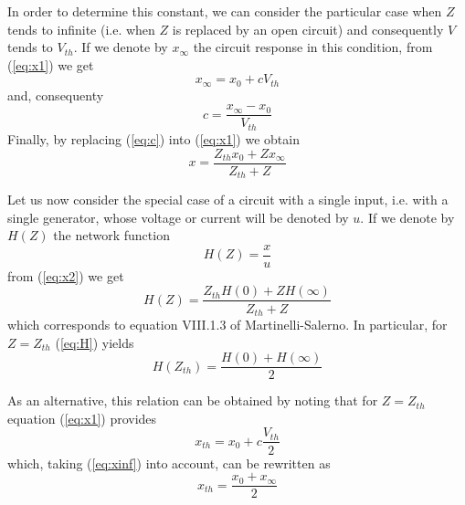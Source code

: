 \documentclass[journal]{IEEEtran}
\begin{document}
In order to determine this constant, we can consider the particular case when $Z$ tends to infinite (i.e. when $Z$ is replaced by an open circuit) and consequently $V$ tends to $V_{th}$. If we denote by $x_{\infty}$ the circuit response in this condition, from (\ref{eq:x1}) we get
\begin{equation}
x_{\infty} = x_{0} + c V_{th}
\label{eq:xinf}
\end{equation}
and, consequenty
\begin{equation}
c = \frac{x_{\infty}-x_{0}}{V_{th}}
\label{eq:c}
\end{equation}
Finally, by replacing (\ref{eq:c}) into (\ref{eq:x1}) we obtain
\begin{equation}
x = \frac{Z_{th}x_{0}+Zx_{\infty}}{Z_{th}+Z}
\label{eq:x2}
\end{equation}

Let us now consider the special case of a circuit with a single input, i.e. with a single generator, whose voltage or current will be denoted by $u$.
If we denote by $H(Z)$ the network function
\begin{equation}
H(Z) = \frac{x}{u}
\label{eq:Hdef}
\end{equation} 
from (\ref{eq:x2}) we get
\begin{equation}
H(Z) = \frac{Z_{th}H(0)+ZH(\infty)}{Z_{th}+Z}
\label{eq:H}
\end{equation}
which corresponds to equation VIII.1.3 of Martinelli-Salerno.
In particular, for $Z = Z_{th}$ (\ref{eq:H}) yields
\begin{equation}
H(Z_{th}) = \frac{H(0)+H(\infty)}{2}
\end{equation}

As an alternative, this relation can be obtained by noting that for $Z = Z_{th}$ equation (\ref{eq:x1}) provides
\begin{equation}
x_{th} = x_{0}+c\frac{V_{th}}{2}
\label{eq:xth}
\end{equation}
which, taking (\ref{eq:xinf}) into account, can be rewritten as
\begin{equation}
x_{th} = \frac{x_{0}+x_{\infty}}{2}
\end{equation}


\end{document}
